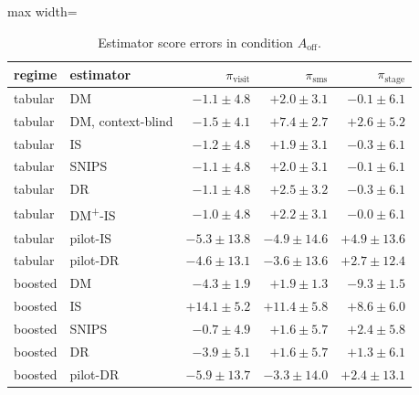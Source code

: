 \begin{table}[!htbp]
\centering
\caption{Estimator score errors in condition $A_{\mathrm{off}}$.}
\label{tab:campaignfullerrors}
\small
\begin{adjustbox}{max width=\linewidth}
\begin{tabular}{llrrr}
\toprule
regime & estimator & $\pi_{\mathrm{visit}}$ & $\pi_{\mathrm{sms}}$ & $\pi_{\mathrm{stage}}$ \\
\midrule
tabular & DM & $-1.1 \pm 4.8$ & $+2.0 \pm 3.1$ & $-0.1 \pm 6.1$ \\
tabular & DM, context-blind & $-1.5 \pm 4.1$ & $+7.4 \pm 2.7$ & $+2.6 \pm 5.2$ \\
tabular & IS & $-1.2 \pm 4.8$ & $+1.9 \pm 3.1$ & $-0.3 \pm 6.1$ \\
tabular & SNIPS & $-1.1 \pm 4.8$ & $+2.0 \pm 3.1$ & $-0.1 \pm 6.1$ \\
tabular & DR & $-1.1 \pm 4.8$ & $+2.5 \pm 3.2$ & $-0.3 \pm 6.1$ \\
tabular & DM\textsuperscript{+}-IS & $-1.0 \pm 4.8$ & $+2.2 \pm 3.1$ & $-0.0 \pm 6.1$ \\
tabular & pilot-IS & $-5.3 \pm 13.8$ & $-4.9 \pm 14.6$ & $+4.9 \pm 13.6$ \\
tabular & pilot-DR & $-4.6 \pm 13.1$ & $-3.6 \pm 13.6$ & $+2.7 \pm 12.4$ \\
boosted & DM & $-4.3 \pm 1.9$ & $+1.9 \pm 1.3$ & $-9.3 \pm 1.5$ \\
boosted & IS & $+14.1 \pm 5.2$ & $+11.4 \pm 5.8$ & $+8.6 \pm 6.0$ \\
boosted & SNIPS & $-0.7 \pm 4.9$ & $+1.6 \pm 5.7$ & $+2.4 \pm 5.8$ \\
boosted & DR & $-3.9 \pm 5.1$ & $+1.6 \pm 5.7$ & $+1.3 \pm 6.1$ \\
boosted & pilot-DR & $-5.9 \pm 13.7$ & $-3.3 \pm 14.0$ & $+2.4 \pm 13.1$ \\
\bottomrule
\end{tabular}
\end{adjustbox}
\end{table}
